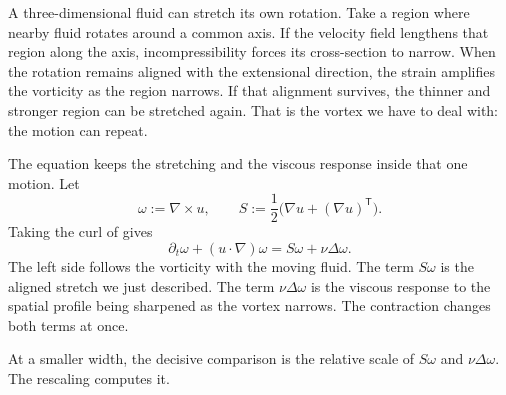 A three-dimensional fluid can stretch its own rotation.
Take a region where nearby fluid rotates around a common axis.
If the velocity field lengthens that region along the axis, incompressibility forces its cross-section to narrow.
When the rotation remains aligned with the extensional direction, the strain amplifies the vorticity as the region narrows.
If that alignment survives, the thinner and stronger region can be stretched again.
That is the vortex we have to deal with: the motion can repeat.

The equation keeps the stretching and the viscous response inside that one motion.
Let
\[
  \omega:=\nabla\times u,
  \qquad
  S:=\frac12\bigl(\nabla u+(\nabla u)^{\mathsf T}\bigr).
\]
Taking the curl of \NavierStokes{} gives
\begin{equation}\label{eq:VorticityEquation}
  \partial_t\omega+(u\cdot\nabla)\omega
  =S\omega+\nu\Delta\omega.
\end{equation}
The left side follows the vorticity with the moving fluid.
The term \(S\omega\) is the aligned stretch we just described.
The term \(\nu\Delta\omega\) is the viscous response to the spatial profile being sharpened as the vortex narrows.
The contraction changes both terms at once.

At a smaller width, the decisive comparison is the relative scale of \(S\omega\) and \(\nu\Delta\omega\).
The \NavierStokes{} rescaling computes it.

